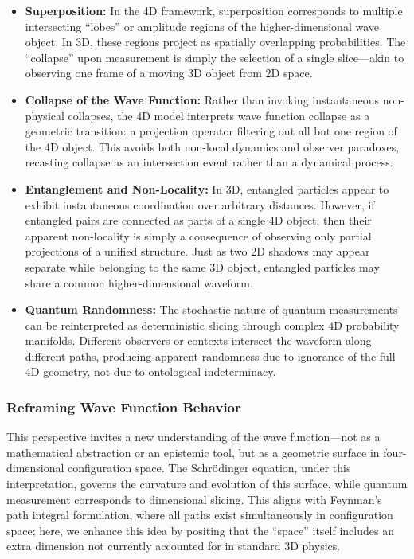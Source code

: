 \documentclass[12pt]{article}
\begin{document}
\begin{itemize}
    \item \textbf{Superposition:} In the 4D framework, superposition corresponds to multiple intersecting “lobes” or amplitude regions of the higher-dimensional wave object. In 3D, these regions project as spatially overlapping probabilities. The “collapse” upon measurement is simply the selection of a single slice—akin to observing one frame of a moving 3D object from 2D space.

    \item \textbf{Collapse of the Wave Function:} Rather than invoking instantaneous non-physical collapses, the 4D model interprets wave function collapse as a geometric transition: a projection operator filtering out all but one region of the 4D object. This avoids both non-local dynamics and observer paradoxes, recasting collapse as an intersection event rather than a dynamical process.

    \item \textbf{Entanglement and Non-Locality:} In 3D, entangled particles appear to exhibit instantaneous coordination over arbitrary distances. However, if entangled pairs are connected as parts of a single 4D object, then their apparent non-locality is simply a consequence of observing only partial projections of a unified structure. Just as two 2D shadows may appear separate while belonging to the same 3D object, entangled particles may share a common higher-dimensional waveform.

    \item \textbf{Quantum Randomness:} The stochastic nature of quantum measurements can be reinterpreted as deterministic slicing through complex 4D probability manifolds. Different observers or contexts intersect the waveform along different paths, producing apparent randomness due to ignorance of the full 4D geometry, not due to ontological indeterminacy.
\end{itemize}

\subsubsection{Reframing Wave Function Behavior}

This perspective invites a new understanding of the wave function—not as a mathematical abstraction or an epistemic tool, but as a geometric surface in four-dimensional configuration space. The Schrödinger equation, under this interpretation, governs the curvature and evolution of this surface, while quantum measurement corresponds to dimensional slicing. This aligns with Feynman's path integral formulation, where all paths exist simultaneously in configuration space; here, we enhance this idea by positing that the ``space'' itself includes an extra dimension not currently accounted for in standard 3D physics.
\end{document}
